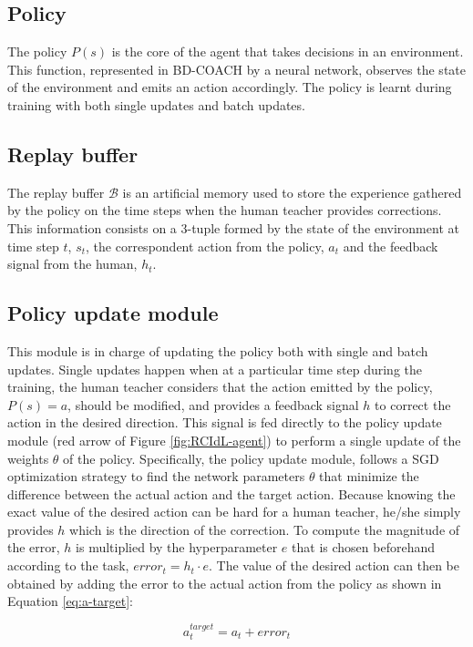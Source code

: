 \subsection*{Policy}

The policy $P(s)$ is the core of the agent that takes decisions in an environment. This function, represented in BD-COACH by a neural network, observes the state of the environment and emits an action accordingly. The policy is learnt during training with both single updates and batch updates. 


\subsection*{Replay buffer}
The replay buffer $\mathcal{B}$ is an artificial memory  used to store the experience gathered by the policy on the time steps when the human teacher provides corrections. This information consists on a 3-tuple formed by the state of the environment at time step $t$,  $s_t$, the correspondent action from the policy, $a_t$ and the feedback signal from the human, $h_t$. 

\subsection*{Policy update module}
This module is in charge of updating the policy both with single and batch updates.
Single updates happen when at a particular time step during the training, the human teacher considers that the action emitted by the policy, $P(s) = a$, should be modified, and provides a feedback signal $h$ to correct the action in the desired direction. This signal is fed directly to the policy update module (red arrow of Figure \ref{fig:RCIdL-agent}) to perform a single update of the weights $\theta$ of the policy. Specifically, the policy update module, follows a SGD optimization strategy to find the network parameters $\theta$ that minimize the difference between the actual action and the target action. Because knowing the exact value of the desired action can be hard for a human teacher, he/she simply provides $h$ which is the direction of the correction. To compute the magnitude of the error, $h$ is multiplied by the hyperparameter $e$ that is chosen beforehand according to the task, ${error}_t = h_t \cdot  e$. The value of the desired action can then be obtained by adding the error to the actual action from the policy as shown in Equation \eqref{eq:a-target}:

\begin{equation}
a^{target}_t = a_t + {error}_t
\label{eq:a-target}
\end{equation}



